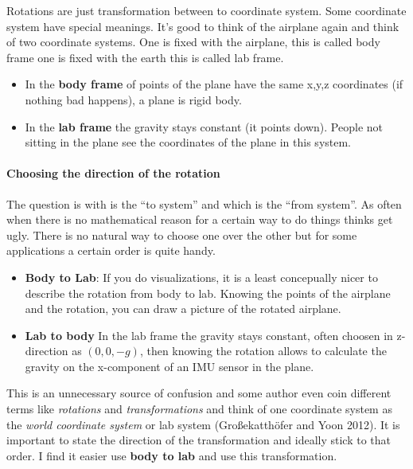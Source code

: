 \documentclass[
  letterpaper,
  DIV=11,
  numbers=noendperiod]{scrartcl}
\let\oldparagraph\paragraph
\renewcommand{\paragraph}[1]{\oldparagraph{#1}\mbox{}}
\begin{document}
Rotations are just transformation between to coordinate system. Some
coordinate system have special meanings. It's good to think of the
airplane again and think of two coordinate systems. One is fixed with
the airplane, this is called body frame one is fixed with the earth this
is called lab frame.

\begin{itemize}
\item
  In the \textbf{body frame} of points of the plane have the same x,y,z
  coordinates (if nothing bad happens), a plane is rigid body.
\item
  In the \textbf{lab frame} the gravity stays constant (it points down).
  People not sitting in the plane see the coordinates of the plane in
  this system.
\end{itemize}

\hypertarget{choosing-the-direction-of-the-rotation}{%
\paragraph{Choosing the direction of the
rotation}\label{choosing-the-direction-of-the-rotation}}

The question is with is the ``to system'' and which is the ``from
system''. As often when there is no mathematical reason for a certain
way to do things thinks get ugly. There is no natural way to choose one
over the other but for some applications a certain order is quite handy.

\begin{itemize}
\item
  \textbf{Body to Lab}: If you do visualizations, it is a least
  concepually nicer to describe the rotation from body to lab. Knowing
  the points of the airplane and the rotation, you can draw a picture of
  the rotated airplane.
\item
  \textbf{Lab to body} In the lab frame the gravity stays constant,
  often choosen in z-direction as \((0,0,-g)\), then knowing the
  rotation allows to calculate the gravity on the x-component of an IMU
  sensor in the plane.
\end{itemize}

This is an unnecessary source of confusion and some author even coin
different terms like \emph{rotations} and \emph{transformations} and
think of one coordinate system as the \emph{world coordinate system} or
lab system (Großekatthöfer and Yoon 2012). It is important to state the
direction of the transformation and ideally stick to that order. I find
it easier use \textbf{body to lab} and use this transformation.
\end{document}
